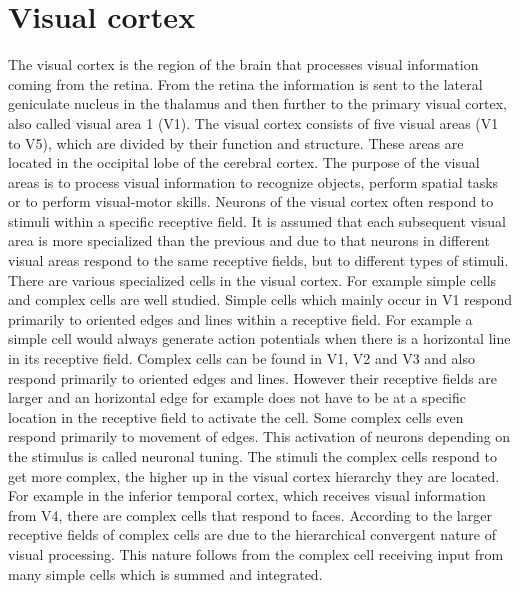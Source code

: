 \section{Visual cortex}

The visual cortex is the region of the brain that processes visual information coming from the retina. From the retina the information is sent to the lateral geniculate nucleus in the thalamus and then further to the primary visual cortex, also called visual area 1 (V1). The visual cortex consists of five visual areas (V1 to V5), which are divided by their function and structure. These areas are located in the occipital lobe of the cerebral cortex. The purpose of the visual areas is to process visual information to recognize objects, perform spatial tasks or to perform  visual-motor skills. Neurons of the visual cortex often respond to stimuli within a specific receptive field. It is assumed that each subsequent visual area is more specialized than the previous and due to that neurons in different visual areas respond to the same receptive fields, but to different types of stimuli. There are various specialized cells in the visual cortex. For example simple cells and complex cells are well studied. Simple cells which mainly occur in V1 respond primarily to oriented edges and lines within a receptive field. For example a simple cell would always generate action potentials when there is a horizontal line in its receptive field. Complex cells can be found in V1, V2 and V3 and also respond primarily to oriented edges and lines. However their receptive fields are larger and an horizontal edge for example does not have to be at a specific location in the receptive field to activate the cell. Some complex cells even respond primarily to movement of edges. \citep{visualCortexBook}
This activation of neurons depending on the stimulus is called neuronal tuning. The stimuli the complex cells respond to get more complex, the higher up in the visual cortex hierarchy they are located. For example in the inferior temporal cortex, which receives visual information from V4, there are complex cells that respond to faces. \citep{complexCellsFaces}
According to \citet{complexCellsIntegrated} the larger receptive fields of complex cells are due to the hierarchical convergent nature of visual processing. This nature follows from the complex cell receiving input from many simple cells which is summed and integrated.

